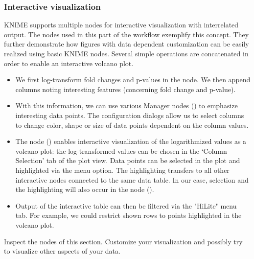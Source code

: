 \subsubsection{Interactive visualization}

KNIME supports multiple nodes for interactive visualization with interrelated output. The nodes used in this part of the workflow exemplify this concept. They further demonstrate how 
figures with data dependent customization can be easily realized using basic KNIME nodes. Several simple operations are concatenated in order to enable an interactive volcano plot.
\begin{itemize}
\item We first log-transform fold changes and p-values in the  node. We then append columns noting interesting features (concerning fold change and p-value).
\item With this information, we can use various Manager nodes () to emphasize interesting data points. The configuration dialogs allow us to select columns to change color, shape or size of data points dependent on the column values.
\item The  node () enables interactive visualization of the logarithmized values as a volcano plot: the log-transformed values can be chosen in the `Column Selection' tab of the plot view. Data points can be selected in the plot and highlighted via the menu option. The highlighting transfers to all other interactive nodes connected to the same data table. In our case, selection and the highlighting will also occur in the  node ().
\item Output of the interactive table can then be filtered via the "HiLite" menu tab. For example, we could restrict shown rows to points highlighted in the volcano plot.
\end{itemize}
\begin{task}
Inspect the nodes of this section. Customize your visualization and possibly try to visualize other aspects of your data.
\end{task}


